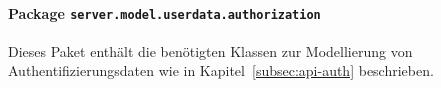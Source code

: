 \FloatBarrier
\paragraph[Package server.model.userdata.authorization]{Package \texttt{server.model.userdata.authorization}}
Dieses Paket enthält die benötigten Klassen zur Modellierung von Authentifizierungsdaten wie in Kapitel~\ref{subsec:api-auth} beschrieben.

       
